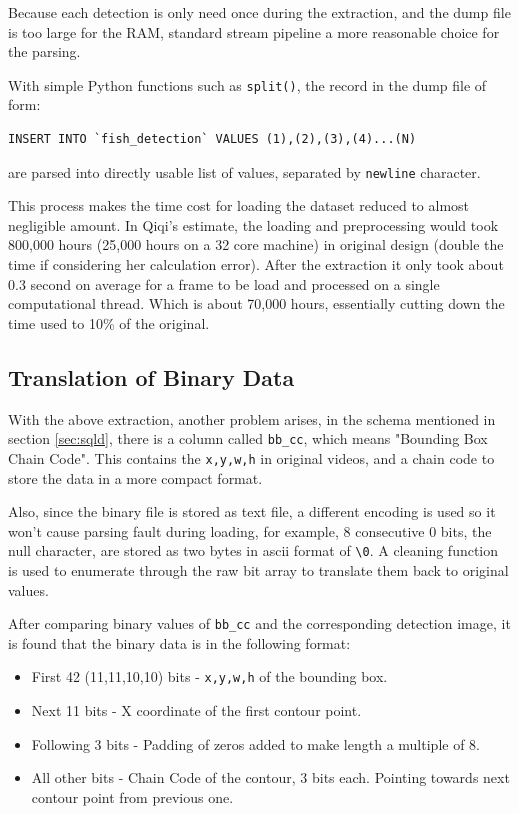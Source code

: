 \documentclass[bsc,logo,twoside,fullspacing,parskip]{infthesis}
\begin{document}
Because each detection is only need once during the extraction, and the dump file is too large for the RAM, standard stream pipeline a more reasonable choice for the parsing. 

With simple Python functions such as {\tt split()}, the record in the dump file of form:
\lstset{basicstyle=\small\ttfamily,breaklines=true,style=sql}
\begin{lstlisting}[frame=single]
 INSERT INTO `fish_detection` VALUES (1),(2),(3),(4)...(N)
\end{lstlisting}
are parsed into directly usable list of values, separated by {\tt newline} character.

This process makes the time cost for loading the dataset reduced to almost negligible amount. In Qiqi's estimate, the loading and preprocessing would took 800,000 hours (25,000 hours on a 32 core machine) in original design (double the time if considering her calculation error). After the extraction it only took about 0.3 second on average for a frame to be load and processed on a single computational thread. Which is about 70,000 hours, essentially cutting down the time used to 10\% of the original.

\subsection{Translation of Binary Data} 

With the above extraction, another problem arises, in the schema mentioned in section \ref{sec:sqld}, there is a column called {\tt bb\_cc}, which means "Bounding Box Chain Code". This contains the {\tt x,y,w,h} in original videos, and a chain code to store the data in a more compact format.

Also, since the binary file is stored as text file, a different encoding is used so it won't cause parsing fault during loading, for example, 8 consecutive 0 bits, the null character, are stored as two bytes in ascii format of {\tt \textbackslash0}. A cleaning function is used to enumerate through the raw bit array to translate them back to original values.

After comparing binary values of {\tt bb\_cc} and the corresponding detection image, it is found that the binary data is in the following format:
\begin{itemize}
\item
First 42 (11,11,10,10) bits - {\tt x,y,w,h} of the bounding box.
\item
Next 11 bits - X coordinate of the first contour point.
\item
Following 3 bits - Padding of zeros added to make length a multiple of 8.
\item
All other bits - Chain Code of the contour, 3 bits each. Pointing towards next contour point from previous one. 
\end{itemize}
\end{document}
